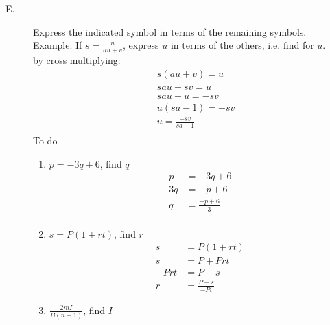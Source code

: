 \documentclass{article}
\begin{document}
\begin{description}
    \item[E. ] Express the indicated symbol in terms of the remaining symbols. \\
        Example: If $s = \frac{u}{au+v}$, express $u$ in terms of the others, i.e. find for $u$. \\
        by cross multiplying:
        \begin{equation}
            \begin{split}
                & s(au + v) = u\\
                & sau + sv = u\\
                & sau - u = -sv\\
                & u(sa - 1) = -sv\\
                & u = \frac{-sv}{sa-1}\\
            \end{split}
        \end{equation}
        To do
        \begin{enumerate}
            \item $p = -3q+6$, find $q$
                  \begin{equation}
                      \begin{split}
                          p & = -3q + 6 \\
                          3q & = -p + 6 \\
                          q & = \frac{-p+6}{3} \\
                      \end{split}
                  \end{equation}
            \item $s = P(1+rt)$, find $r$
                  \begin{equation}
                      \begin{split}
                          s & = P(1+rt) \\
                          s & = P +Prt \\
                          -Prt & = P - s \\
                          r & = \frac{P - s}{-Pt}
                      \end{split}
                  \end{equation}
            \item $\frac{2mI}{B(n+1)}$, find $I$
                  \begin{equation}
                      \begin{split}

\end{split}
\end{equation}
\end{enumerate}
\end{description}
\end{document}
